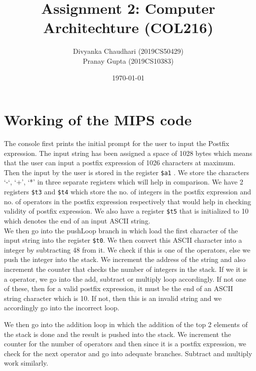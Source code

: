 \documentclass[a4paper]{article}
\title{Assignment 2: Computer Architechture (COL216)}
\author{
Divyanka Chaudhari (2019CS50429)\\
Pranay Gupta (2019CS10383)} \\
\date{\today}
\begin{document}
\maketitle

\section{Working of the MIPS code}

The console first prints the initial prompt for the user to input the Postfix expression. The input string has been assigned a space of 1028 bytes which means that the user can input a postfix expression of 1026 characters at maximum. Then the input by the user is stored in the register \texttt{\$a1} . We store the characters ‘-‘, ‘+’, ‘*’ in three separate registers which will help in comparison. We have 2 registers \texttt{\$t3} and \texttt{\$t4} which store the no. of integers in the postfix expression and no. of operators in the postfix expression respectively that would help in checking validity of postfix expression.  We also have a register \texttt{\$t5} that is initialized to 10 which denotes the end of an input ASCII string.\\

We then go into the pushLoop branch in which load the first character of the input string into the register \texttt{\$t0}. We then convert this ASCII character into a integer by subtracting 48 from it. We check if this is one of the operators, else we push the integer into the stack. We increment the address of the string and also increment the counter that checks the number of integers in the stack. If we it is a operator, we go into the add, subtract or multiply loop accordingly. If not one of these, then for a valid postfix expression, it must be the end of an ASCII string character which is 10. If not, then this is an invalid string and we accordingly go into the incorrect loop.

We then go into the addition loop in which the addition of the top 2 elements of the stack is done and the result is pushed into the stack. We increment the counter for the number of operators and then since it is a postfix expression, we check for the next operator and go into adequate branches. Subtract and multiply work similarly.\\
\end{document}
